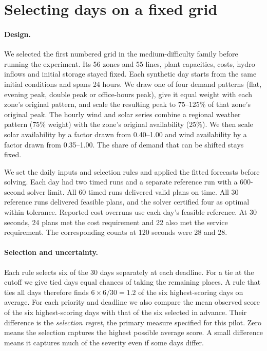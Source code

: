 \documentclass[11pt,a4paper]{article}
\begin{document}
\section{Selecting days on a fixed grid}
\label{app:fixeddays}

\paragraph{Design.}
We selected the first numbered grid in the medium-difficulty family before running the experiment. Its 56 zones and 55 lines, plant capacities, costs, hydro inflows and initial storage stayed fixed. Each synthetic day starts from the same initial conditions and spans 24 hours. We draw one of four demand patterns (flat, evening peak, double peak or office-hours peak), give it equal weight with each zone's original pattern, and scale the resulting peak to 75--125\% of that zone's original peak. The hourly wind and solar series combine a regional weather pattern (75\% weight) with the zone's original availability (25\%). We then scale solar availability by a factor drawn from 0.40--1.00 and wind availability by a factor drawn from 0.35--1.00. The share of demand that can be shifted stays fixed.

We set the daily inputs and selection rules and applied the fitted forecasts before solving. Each day had two timed runs and a separate reference run with a 600-second solver limit. All 60 timed runs delivered valid plans on time. All 30 reference runs delivered feasible plans, and the solver certified four as optimal within tolerance. Reported cost overruns use each day's feasible reference. At 30 seconds, 24 plans met the cost requirement and 22 also met the service requirement. The corresponding counts at 120 seconds were 28 and 28.

\paragraph{Selection and uncertainty.}
Each rule selects six of the 30 days separately at each deadline. For a tie at the cutoff we give tied days equal chances of taking the remaining places. A rule that ties all days therefore finds \(6\times6/30=1.2\) of the six highest-scoring days on average. For each priority and deadline we also compare the mean observed score of the six highest-scoring days with that of the six selected in advance. Their difference is the \emph{selection regret}, the primary measure specified for this pilot. Zero means the selection captures the highest possible average score. A small difference means it captures much of the severity even if some days differ.
\end{document}
